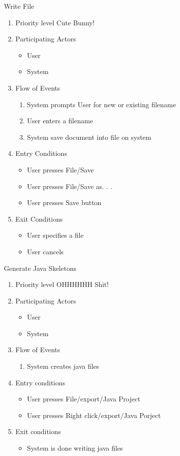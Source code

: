 \documentclass[a4paper, 12pt]{article}
\begin{document}
\item Write File
  \begin {enumerate}
  \item Priority level Cute Bunny!
  \item Participating Actors
    \begin {itemize}
    \item User
    \item System
    \end {itemize}
  \item Flow of Events
    \begin {enumerate}
    \item System prompts User for new or existing filename
    \item User enters a filename
    \item System save document into file on system
    \end {enumerate}
  \item Entry Conditions
    \begin {itemize}
    \item User presses File/Save
    \item User presses File/Save as. . .
    \item User presses Save button
    \end {itemize}
  \item Exit Conditions
    \begin {itemize}
    \item User specifies a file
    \item User cancels
    \end {itemize}
  \end {enumerate}

\item Generate Java Skeletons
  \begin {enumerate}
  \item Priority level OHHHHHH Shit!
  \item Participating Actors
    \begin {itemize}
    \item User
    \item System
    \end {itemize}
  \item Flow of Events
    \begin {enumerate}
    \item System creates java files
    \end {enumerate}
  \item Entry conditions
    \begin {itemize}
    \item User presses File/export/Java Project
    \item User presses Right click/export/Java Porject
    \end {itemize}
  \item Exit conditions
    \begin {itemize}
    \item System is done writing java files
    \end{itemize}
  \end {enumerate}
\end{document}
